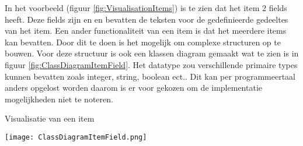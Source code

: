 \whitespace
In het voorbeeld (figuur \ref{fig:VisualisationItems}) is te zien dat het item  2 fields heeft.
Deze fields zijn  en  en bevatten de teksten voor de gedefinieerde gedeeltes van het item.
Een ander functionaliteit van een item is dat het meerdere items kan bevatten. 
Door dit te doen is het mogelijk om complexe structuren op te bouwen.
Voor deze structuur is ook een klassen diagram gemaakt wat te zien is in figuur \ref{fig:ClassDiagramItemField}.
Het datatype  zou verschillende primaire types kunnen bevatten zoals integer, string, boolean ect..
Dit kan per programmeertaal anders opgelost worden daarom is er voor gekozen om de implementatie mogelijkheden niet te noteren.

\whitespace[2]
\begin{graphic}
    \captionsetup{type=figure}
    \caption{Visualisatie van een item}
    \texttt{[image: ClassDiagramItemField.png]}
    \label{fig:ClassDiagramItemField}
\end{graphic}
%
%
%
%
%
%
